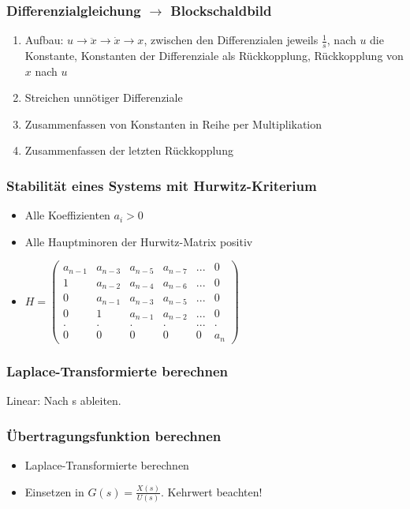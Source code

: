 \subsubsection{Differenzialgleichung \(\rightarrow\) Blockschaldbild}
\begin{enumerate}
	\item Aufbau: \(u \rightarrow \ddot{x} \rightarrow \dot{x} \rightarrow x\), zwischen den Differenzialen jeweils \(\frac{1}{s}\), nach \(u\) die Konstante, Konstanten der Differenziale als Rückkopplung, Rückkopplung von \(x\) nach \(u\)
	\item Streichen unnötiger Differenziale
	\item Zusammenfassen von Konstanten in Reihe per Multiplikation
	\item Zusammenfassen der letzten Rückkopplung
\end{enumerate}

\subsubsection{Stabilität eines Systems mit Hurwitz-Kriterium}
\begin{itemize}
	\item Alle Koeffizienten \(a_i > 0\)
	\item Alle Hauptminoren der Hurwitz-Matrix positiv
	\item \(H = \begin{pmatrix}
					a_{n-1} & a_{n-3} & a_{n-5} & a_{n-7} & ... & 0 \\
					1 & a_{n-2} & a_{n-4} & a_{n-6} & ... & 0 \\
					0 & a_{n-1} & a_{n-3} & a_{n-5} & ... & 0 \\
					0 & 1 & a_{n-1} & a_{n-2} & ... & 0 \\
					. & . & . & . & ... & . \\
					0 & 0 & 0 & 0 & 0 & a_n
				\end{pmatrix}\)
\end{itemize}

\subsubsection{Laplace-Transformierte berechnen}
Linear: Nach s ableiten.

\subsubsection{Übertragungsfunktion berechnen}
\begin{itemize}
	\item Laplace-Transformierte berechnen
	\item Einsetzen in \(G(s) = \frac{X(s)}{U(s)}\). Kehrwert beachten!
\end{itemize}


